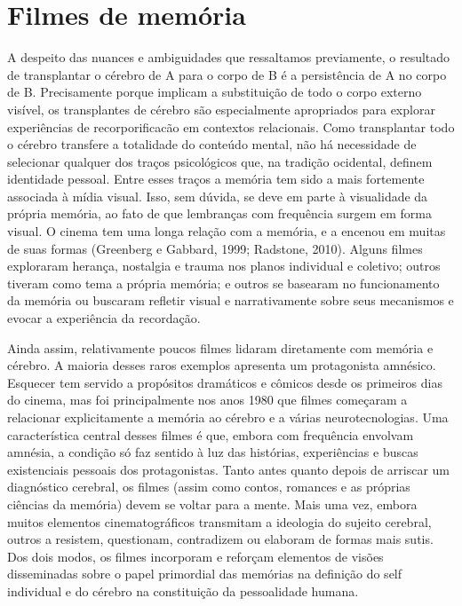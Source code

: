 \chapter{Filmes de memória}

A despeito das nuances e ambiguidades que ressaltamos previamente, o
resultado de transplantar o cérebro de A para o corpo de B é a
persistência de A no corpo de B. Precisamente porque implicam a
substituição de todo o corpo externo visível, os transplantes de cérebro
são especialmente apropriados para explorar experiências de
recorporificacão em contextos relacionais. Como transplantar todo o
cérebro transfere a totalidade do conteúdo mental, não há necessidade de
selecionar qualquer dos traços psicológicos que, na tradição ocidental,
definem identidade pessoal. Entre esses traços a memória tem sido a mais
fortemente associada à mídia visual. Isso, sem dúvida, se deve em parte
à visualidade da própria memória, ao fato de que lembranças com
frequência surgem em forma visual. O cinema tem uma longa relação com a
memória, e a encenou em muitas de suas formas (Greenberg e Gabbard,
1999; Radstone, 2010). Alguns filmes exploraram herança, nostalgia e
trauma nos planos individual e coletivo; outros tiveram como tema a
própria memória; e outros se basearam no funcionamento da memória ou
buscaram refletir visual e narrativamente sobre seus mecanismos e evocar
a experiência da recordação.

Ainda assim, relativamente poucos filmes lidaram diretamente com memória
e cérebro. A maioria desses raros exemplos apresenta um protagonista
amnésico. Esquecer tem servido a propósitos dramáticos e cômicos desde
os primeiros dias do cinema, mas foi principalmente nos anos 1980 que
filmes começaram a relacionar explicitamente a memória ao cérebro e a
várias neurotecnologias. Uma característica central desses filmes é que,
embora com frequência envolvam amnésia, a condição só faz sentido à luz
das histórias, experiências e buscas existenciais pessoais dos
protagonistas. Tanto antes quanto depois de arriscar um diagnóstico
cerebral, os filmes (assim como contos, romances e as próprias ciências
da memória) devem se voltar para a mente. Mais uma vez, embora muitos
elementos cinematográficos transmitam a ideologia do sujeito cerebral,
outros a resistem, questionam, contradizem ou elaboram de formas mais
sutis. Dos dois modos, os filmes incorporam e reforçam elementos de
visões disseminadas sobre o papel primordial das memórias na definição
do self individual e do cérebro na constituição da pessoalidade humana.

